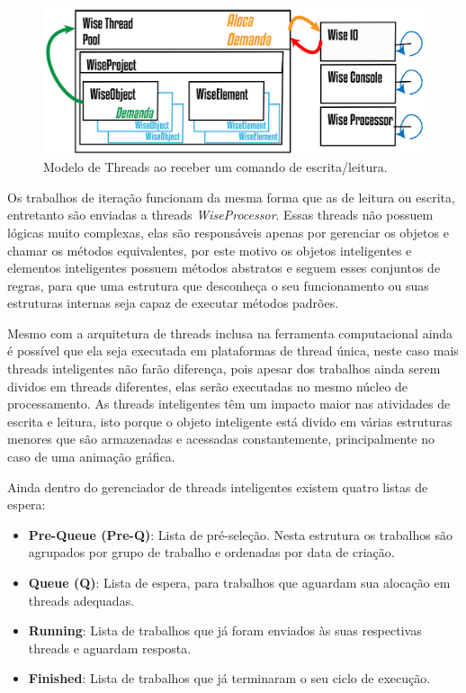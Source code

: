 \documentclass[a4paper,12pt]{monografia}
\theoremstyle{plain}
\theoremstyle{definition}
\theoremstyle{remark}
\begin{document}
\begin{figure}[!htbp]
	\centering
	\includegraphics[width=\linewidth]{Figures/WiseThreadPoolHeating@16x.png}
	\caption{Modelo de Threads ao receber um comando de escrita/leitura.}
	\label{fig9:threads}
\end{figure}

Os trabalhos de iteração funcionam da mesma forma que as de leitura ou escrita, entretanto são enviadas a threads \textit{WiseProcessor}. Essas threads não possuem lógicas muito complexas, elas são responsáveis apenas por gerenciar os objetos e chamar os métodos equivalentes, por este motivo os objetos inteligentes e elementos inteligentes possuem métodos abstratos e seguem esses conjuntos de regras, para que uma estrutura que desconheça o seu funcionamento ou suas estruturas internas seja capaz de executar métodos padrões. 

Mesmo com a arquitetura de threads inclusa na ferramenta computacional ainda é possível que ela seja executada em plataformas de thread única, neste caso mais threads inteligentes não farão diferença, pois apesar dos trabalhos ainda serem dividos em threads diferentes, elas serão executadas no mesmo núcleo de processamento. As threads inteligentes têm um impacto maior nas atividades de escrita e leitura, isto porque o objeto inteligente está divido em várias estruturas menores que são armazenadas e acessadas constantemente, principalmente no caso de uma animação gráfica.

Ainda dentro do gerenciador de threads inteligentes existem quatro listas de espera:

\begin{itemize}
	\item \textbf{Pre-Queue (Pre-Q)}: Lista de pré-seleção. Nesta estrutura os trabalhos são agrupados por grupo de trabalho e ordenadas por data de criação.
	\item \textbf{Queue (Q)}: Lista de espera, para trabalhos que aguardam sua alocação em threads adequadas.
	\item \textbf{Running}: Lista de trabalhos que já foram enviados às suas respectivas threads e aguardam resposta.
	\item \textbf{Finished}: Lista de trabalhos que já terminaram o seu ciclo de execução.
\end{itemize}
\end{document}
